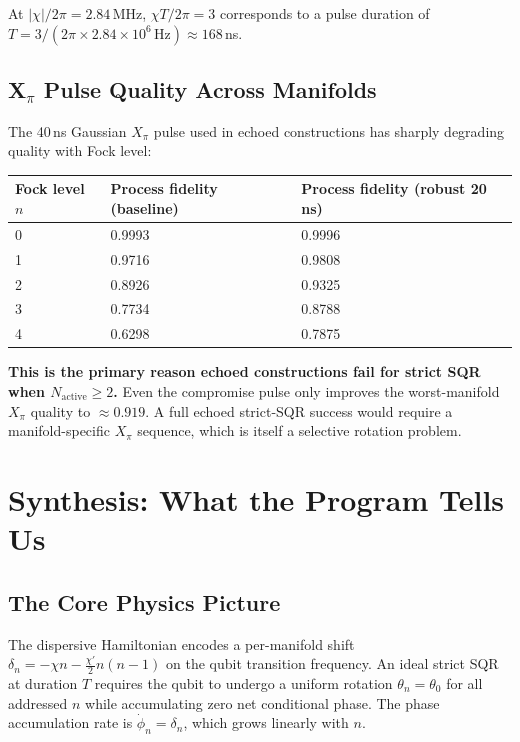 \documentclass[11pt,letterpaper]{article}
\newcommand{\chiT}{\chi T / 2\pi}
\newcommand{\nact}{N_{\text{active}}}
\begin{document}
At $|\chi|/2\pi = 2.84$\,MHz, $\chiT = 3$ corresponds to a pulse duration of
$T = 3 / (2\pi \times 2.84 \times 10^6\,\text{Hz}) \approx 168$\,ns.

\subsection{X$_\pi$ Pulse Quality Across Manifolds}

The 40\,ns Gaussian $X_\pi$ pulse used in echoed constructions
has sharply degrading quality with Fock level:

\begin{center}
\begin{tabular}{lll}
\toprule
Fock level $n$ & Process fidelity (baseline) & Process fidelity (robust 20\,ns) \\
\midrule
0 & 0.9993 & 0.9996 \\
1 & 0.9716 & 0.9808 \\
2 & 0.8926 & 0.9325 \\
3 & 0.7734 & 0.8788 \\
4 & 0.6298 & 0.7875 \\
\bottomrule
\end{tabular}
\end{center}

\noindent\textbf{This is the primary reason echoed constructions fail for strict SQR
when $\nact \ge 2$.}
Even the compromise pulse only improves the worst-manifold $X_\pi$ quality to $\approx 0.919$.
A full echoed strict-SQR success would require a manifold-specific $X_\pi$ sequence,
which is itself a selective rotation problem.

\section{Synthesis: What the Program Tells Us}

\subsection{The Core Physics Picture}

The dispersive Hamiltonian encodes a per-manifold shift
$\delta_n = -\chi n - \frac{\chi'}{2}n(n-1)$ on the qubit transition frequency.
An ideal strict SQR at duration $T$ requires the qubit to undergo a uniform
rotation $\theta_n = \theta_0$ for all addressed $n$ while accumulating zero
net conditional phase.  The phase accumulation rate is $\dot\phi_n = \delta_n$,
which grows linearly with $n$.
\end{document}
